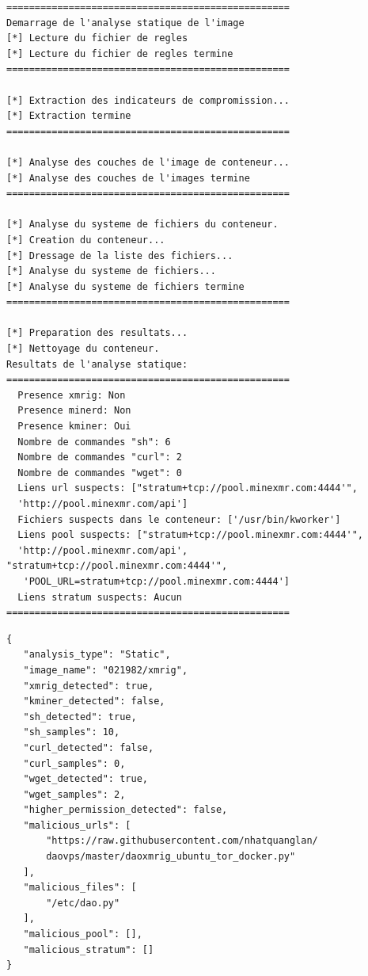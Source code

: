 \begin{lstlisting}[caption=Retour CLI fake-miner:latest]
==================================================
Demarrage de l'analyse statique de l'image
[*] Lecture du fichier de regles
[*] Lecture du fichier de regles termine
==================================================

[*] Extraction des indicateurs de compromission...
[*] Extraction termine
==================================================

[*] Analyse des couches de l'image de conteneur...
[*] Analyse des couches de l'images termine
==================================================

[*] Analyse du systeme de fichiers du conteneur.
[*] Creation du conteneur...
[*] Dressage de la liste des fichiers...
[*] Analyse du systeme de fichiers...
[*] Analyse du systeme de fichiers termine
==================================================

[*] Preparation des resultats...
[*] Nettoyage du conteneur.
Resultats de l'analyse statique:
==================================================
  Presence xmrig: Non
  Presence minerd: Non
  Presence kminer: Oui
  Nombre de commandes "sh": 6
  Nombre de commandes "curl": 2
  Nombre de commandes "wget": 0
  Liens url suspects: ["stratum+tcp://pool.minexmr.com:4444'", 
  'http://pool.minexmr.com/api']
  Fichiers suspects dans le conteneur: ['/usr/bin/kworker']
  Liens pool suspects: ["stratum+tcp://pool.minexmr.com:4444'", 
  'http://pool.minexmr.com/api', "stratum+tcp://pool.minexmr.com:4444'",
   'POOL_URL=stratum+tcp://pool.minexmr.com:4444']
  Liens stratum suspects: Aucun
==================================================
\end{lstlisting}

\begin{lstlisting}[caption=Retour rapport 021982/xmrig:latest]
{
   "analysis_type": "Static",
   "image_name": "021982/xmrig",
   "xmrig_detected": true,
   "kminer_detected": false,
   "sh_detected": true,
   "sh_samples": 10,
   "curl_detected": false,
   "curl_samples": 0,
   "wget_detected": true,
   "wget_samples": 2,
   "higher_permission_detected": false,
   "malicious_urls": [
       "https://raw.githubusercontent.com/nhatquanglan/
       daovps/master/daoxmrig_ubuntu_tor_docker.py"
   ],
   "malicious_files": [
       "/etc/dao.py"
   ],
   "malicious_pool": [],
   "malicious_stratum": []
}
\end{lstlisting}

